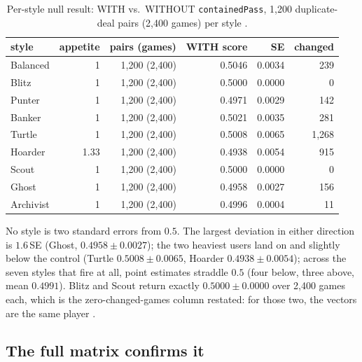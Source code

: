 \documentclass[11pt]{article}
\newcommand{\code}[1]{\texttt{#1}}
\begin{document}
\begin{table}[ht]
\centering
\caption{Per-style null result: WITH vs.\ WITHOUT \code{containedPass},
1{,}200 duplicate-deal pairs (2{,}400 games) per style \cite{styles}.}
\label{tab:null}
\small
\begin{tabular}{@{}l r r r r r@{}}
\toprule
style & appetite & pairs (games) & WITH score & SE & changed \\
\midrule
Balanced  & 1    & 1{,}200 (2{,}400) & 0.5046 & 0.0034 & 239 \\
Blitz     & 1    & 1{,}200 (2{,}400) & 0.5000 & 0.0000 & 0 \\
Punter    & 1    & 1{,}200 (2{,}400) & 0.4971 & 0.0029 & 142 \\
Banker    & 1    & 1{,}200 (2{,}400) & 0.5021 & 0.0035 & 281 \\
Turtle    & 1    & 1{,}200 (2{,}400) & 0.5008 & 0.0065 & 1{,}268 \\
Hoarder   & 1.33 & 1{,}200 (2{,}400) & 0.4938 & 0.0054 & 915 \\
Scout     & 1    & 1{,}200 (2{,}400) & 0.5000 & 0.0000 & 0 \\
Ghost     & 1    & 1{,}200 (2{,}400) & 0.4958 & 0.0027 & 156 \\
Archivist & 1    & 1{,}200 (2{,}400) & 0.4996 & 0.0004 & 11 \\
\bottomrule
\end{tabular}
\end{table}

No style is two standard errors from $0.5$. The largest deviation in either
direction is $1.6$\,SE (Ghost, $0.4958 \pm 0.0027$); the two heaviest users
land on and slightly below the control (Turtle $0.5008 \pm 0.0065$, Hoarder
$0.4938 \pm 0.0054$); across the seven styles that fire at all, point
estimates straddle $0.5$ (four below, three above, mean $0.4991$). Blitz and
Scout return exactly $0.5000 \pm 0.0000$ over 2{,}400 games each, which is the
zero-changed-games column restated: for those two, the vectors are the same
player \cite{styles}.

\subsection{The full matrix confirms it}
\label{sec:matrix}
\end{document}

